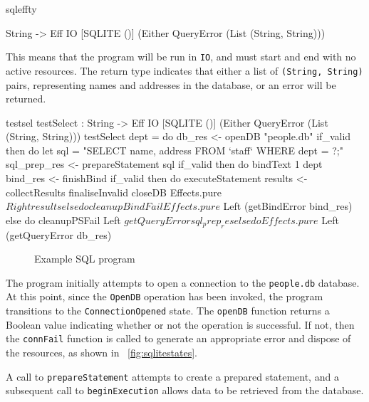 \noindent
\begin{SaveVerbatim}{sqleffty}

String ->
Eff IO [SQLITE ()] (Either QueryError (List (String, String)))

\end{SaveVerbatim}

\noindent
This means that the program will be run in \texttt{IO}, and must
start and end with no active resources. The return type indicates that either a
list of \texttt{(String, String)} pairs, representing names and addresses in the
database, or an error will be returned.

\begin{SaveVerbatim}{testsel}
testSelect : String -> Eff IO [SQLITE ()] 
             (Either QueryError (List (String, String)))
testSelect dept = do
  db_res <- openDB "people.db"
  if_valid then do
    let sql = "SELECT name, address FROM `staff` 
                    WHERE dept = ?;"
    sql_prep_res <- prepareStatement sql
    if_valid then do 
      bindText 1 dept
      bind_res <- finishBind
      if_valid then do
        executeStatement
        results <- collectResults
        finaliseInvalid
        closeDB
        Effects.pure $ Right results
      else do
        cleanupBindFail
        Effects.pure $ Left (getBindError bind_res)
    else do
      cleanupPSFail
      Left $ getQueryError sql_prep_res
  else do 
    Effects.pure $ Left (getQueryError db_res)
\end{SaveVerbatim}

\begin{figure}[h]
\caption{Example SQL program}
\label{fig:testsel}
\end{figure}

The program initially attempts to open a connection to the \texttt{people.db}
database. At this point, since the \texttt{OpenDB} operation has been invoked,
the program transitions to the \texttt{ConnectionOpened} state. The
\texttt{openDB} function returns a Boolean value indicating whether or not the
operation is successful. If not, then the \texttt{connFail} function is called
to generate an appropriate error and dispose of the resources, as shown in
~\ref{fig:sqlitestates}.

A call to \texttt{prepareStatement} attempts to create a prepared statement,
and a subsequent call to \texttt{beginExecution} allows data to be retrieved
from the database.

